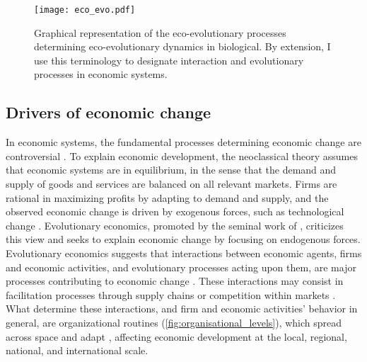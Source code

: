 \begin{figure}[ht]
    \centering
    \texttt{[image: eco\_evo.pdf]}
\caption{Graphical representation of the eco-evolutionary processes determining eco-evolutionary dynamics in biological. By extension, I use this terminology to designate interaction and evolutionary processes in economic systems.}
\label{fig:eco_evo}
\end{figure}

\subsection{Drivers of economic change}
In economic systems, the fundamental processes determining economic change are controversial \citep{Dopfer,Nelson2014,Hodgson2019}. 
To explain economic development, the neoclassical theory \citep{10.1093/cje/bet027} assumes that economic systems are in equilibrium, in the sense that the demand and supply of goods and services are balanced on all relevant markets. 
Firms are rational in maximizing profits by adapting to demand and supply, and the observed economic change is driven by exogenous forces, such as technological change \citep{Romer1986}. Evolutionary economics, promoted by the seminal work of \cite{Nelson2014}, criticizes this view and seeks to explain economic change by focusing on endogenous forces. 
% 
Evolutionary economics suggests that interactions between economic agents, firms and economic activities, and evolutionary processes acting upon them, are major processes contributing to economic change \citep{Hodgson2019}.
% 
These interactions may consist in facilitation processes through supply chains \citep{Ozman2009,Saavedra2009a,VanDerPanne2004} or competition within markets \citep{Wernerfelt1989}. What determine these interactions, and firm and economic activities' behavior in general, are organizational routines (\cref{fig:organisational_levels}), which spread across space and adapt \citep{Cordes2006}, affecting economic development at the local, regional, national, and international scale.
%
